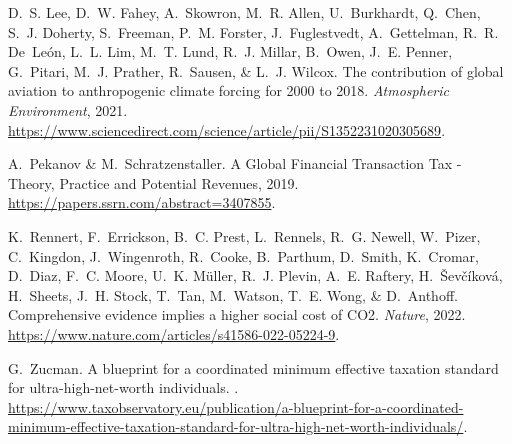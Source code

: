 \documentclass[12pt,english]{article}
\begin{document}
\begin{bibunit}
\begin{thebibliography}{7}
D.~S. Lee, D.~W. Fahey, A.~Skowron, M.~R. Allen, U.~Burkhardt, Q.~Chen, S.~J.
  Doherty, S.~Freeman, P.~M. Forster, J.~Fuglestvedt, A.~Gettelman, R.~R.
  De~Le{\'o}n, L.~L. Lim, M.~T. Lund, R.~J. Millar, B.~Owen, J.~E. Penner,
  G.~Pitari, M.~J. Prather, R.~Sausen, \& L.~J. Wilcox.
\newblock The contribution of global aviation to anthropogenic climate forcing
  for 2000 to 2018.
\newblock \emph{Atmospheric Environment}, 2021.
\newblock
  \url{https://www.sciencedirect.com/science/article/pii/S1352231020305689}.

A.~Pekanov \& M.~Schratzenstaller.
\newblock A {{Global Financial Transaction Tax}} - {{Theory}}, {{Practice}} and
  {{Potential Revenues}}, 2019.
\newblock \url{https://papers.ssrn.com/abstract=3407855}.

K.~Rennert, F.~Errickson, B.~C. Prest, L.~Rennels, R.~G. Newell, W.~Pizer,
  C.~Kingdon, J.~Wingenroth, R.~Cooke, B.~Parthum, D.~Smith, K.~Cromar,
  D.~Diaz, F.~C. Moore, U.~K. M{\"u}ller, R.~J. Plevin, A.~E. Raftery, H.~{\v
  S}ev{\v c}{\'i}kov{\'a}, H.~Sheets, J.~H. Stock, T.~Tan, M.~Watson, T.~E.
  Wong, \& D.~Anthoff.
\newblock Comprehensive evidence implies a higher social cost of {{CO2}}.
\newblock \emph{Nature}, 2022.
\newblock \url{https://www.nature.com/articles/s41586-022-05224-9}.

G.~Zucman.
\newblock A blueprint for a coordinated minimum effective taxation standard for
  ultra-high-net-worth individuals.
.
\newblock
  \url{https://www.taxobservatory.eu/publication/a-blueprint-for-a-coordinated-minimum-effective-taxation-standard-for-ultra-high-net-worth-individuals/}.

\end{thebibliography}


\end{bibunit}
\end{document}
